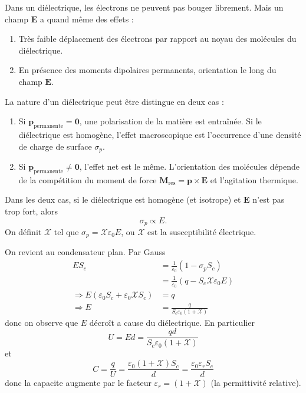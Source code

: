 
Dans un diélectrique, les électrons ne peuvent pas bouger librement. Mais un champ $\boldsymbol{E}$ a quand même des effets :
\begin{enumerate}
\item Très faible déplacement des électrons par rapport au noyau des molécules du diélectrique.
\item En présence des moments dipolaires permanents, orientation le long du champ $\boldsymbol{E}$.
\end{enumerate}

La nature d'un diélectrique peut être distingue en deux cas :
\begin{enumerate}
\item Si $\boldsymbol{p}_{\text{permanente}}=\boldsymbol{0}$, une polarisation de la matière est entraînée. Si le diélectrique est homogène, l'effet macroscopique est l'occurrence d'une densité de charge de surface $\sigma _{p}$.
\item Si $\boldsymbol{p}_{\text{permanente}}\neq \boldsymbol{0}$, l'effet net est le même. L'orientation des molécules dépende de la compétition du moment de force $\boldsymbol{M}_{\mathrm{res}}=\boldsymbol{p}\times \boldsymbol{E}$ et l'agitation thermique.
\end{enumerate}
Dans les deux cas, si le diélectrique est homogène (et isotrope) et $\boldsymbol{E}$ n'est pas trop fort, alors
$$
\sigma _{p}\propto E. 
$$
On définit $\mathcal{X}$ tel que $\sigma _{p}=\mathcal{X}\varepsilon_{0}E$, ou $\mathcal{X}$ est la susceptibilité électrique.

On revient au condensateur plan. Par Gauss
\begin{align*}
ES_{c} & =\frac{1}{\varepsilon_{0}}(1-\sigma _{p}S_{c}) \\
 & =\frac{1}{\varepsilon_{0}}(q-S_{c}\mathcal{X}\varepsilon_{0}E)  \\
 \Rightarrow E(\varepsilon_{0}S_{c}+\varepsilon_{0}\mathcal{X}S_{c} ) & =q \\
\Rightarrow E & =\frac{q}{S_{c}\varepsilon_{0}(1+\mathcal{X})}
\end{align*}
donc on observe que $E$ décroît a cause du diélectrique. En particulier
$$
U=Ed=\frac{qd}{S_{c}\varepsilon_{0}(1+\mathcal{X})}
$$
et 
$$
C=\frac{q}{U}=\frac{\varepsilon_{0}(1+\mathcal{X})S_{c}}{d}=\frac{\varepsilon_{0}\varepsilon _{r}S_{c}}{d}
$$
donc la capacite augmente par le facteur $\varepsilon _{r}=(1+\mathcal{X})$ (la permittivité relative).

